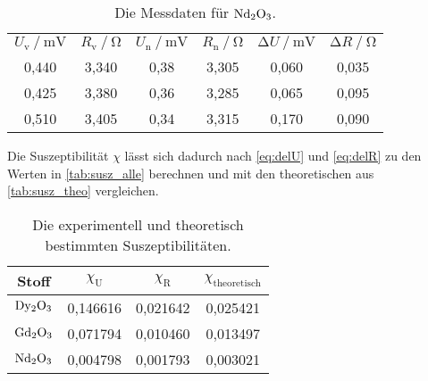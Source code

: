 \begin{table}[H]
  \centering
  \caption{Die Messdaten für $\ce{Nd2O3}$.}
  \label{tab:nd}
  \begin{tabular}{c c c c c c}
    \toprule 
    
    \multicolumn{1}{c}{$U_\text{v} \mathbin{/} \unit{\milli\volt}$} &
    \multicolumn{1}{c}{$R_\text{v} \mathbin{/} \unit{\ohm} $} &
    \multicolumn{1}{c}{$U_\text{n} \mathbin{/} \unit{\milli\volt}$} &
    \multicolumn{1}{c}{$R_\text{n} \mathbin{/} \unit{\ohm}$}& 
    \multicolumn{1}{c}{$\increment U \mathbin{/} \unit{\milli\volt}$}&
    \multicolumn{1}{c}{$\increment R \mathbin{/} \unit{\ohm}$} \\

    \cmidrule(lr){1-2} \cmidrule(lr){3-4} \cmidrule(lr){5-6}

    0,440 & 3,340 & 0,38 & 3,305 &   0,060 &   0,035 \\
    0,425 & 3,380 & 0,36 & 3,285 &   0,065 &   0,095 \\
    0,510 & 3,405 & 0,34 & 3,315 &   0,170 &   0,090 \\
    \bottomrule
  \end{tabular} 
\end{table}

Die Suszeptibilität $\chi$ lässt sich dadurch nach \autoref{eq:delU} und \autoref{eq:delR} zu den Werten in \autoref{tab:susz_alle} berechnen
und mit den theoretischen aus \autoref{tab:susz_theo} vergleichen.
\begin{table}
  \centering
  \caption{Die experimentell und theoretisch bestimmten Suszeptibilitäten.}
  \label{tab:susz_alle}
  \begin{tabular}{c c c c}
    \toprule
    Stoff &    
    $\chi_\text{U}$ &
    $\chi_\text{R}$ &
    $\chi_\text{theoretisch}$ \\
    \midrule
    $\ce{Dy2O3}$ & 0,146616 & 0,021642 &   0,025421 \\
    $\ce{Gd2O3}$ & 0,071794 & 0,010460 &   0,013497 \\
    $\ce{Nd2O3}$ & 0,004798 & 0,001793 &   0,003021 \\
    \bottomrule
  \end{tabular}
\end{table}